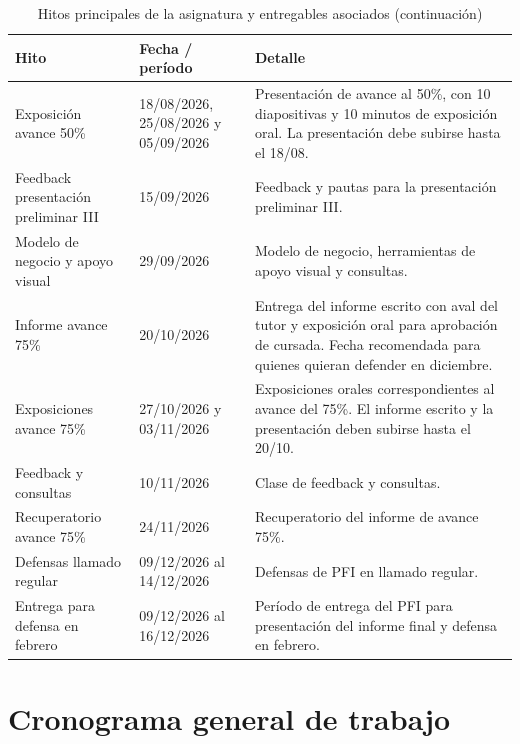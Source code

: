 \begin{table}[H]
\centering
\caption{Hitos principales de la asignatura y entregables asociados (continuación)}
\label{tab:hitos_pfi_continuacion}
\small
\begin{tabularx}{\textwidth}{p{} p{} X}
\hline
\textbf{Hito} & \textbf{Fecha / período} & \textbf{Detalle} \\
\hline
Exposición avance 50\% & 18/08/2026, 25/08/2026 y 05/09/2026 & Presentación de avance al 50\%, con 10 diapositivas y 10 minutos de exposición oral. La presentación debe subirse hasta el 18/08. \\
Feedback presentación preliminar III & 15/09/2026 & Feedback y pautas para la presentación preliminar III. \\
Modelo de negocio y apoyo visual & 29/09/2026 & Modelo de negocio, herramientas de apoyo visual y consultas. \\
Informe avance 75\% & 20/10/2026 & Entrega del informe escrito con aval del tutor y exposición oral para aprobación de cursada. Fecha recomendada para quienes quieran defender en diciembre. \\
Exposiciones avance 75\% & 27/10/2026 y 03/11/2026 & Exposiciones orales correspondientes al avance del 75\%. El informe escrito y la presentación deben subirse hasta el 20/10. \\
Feedback y consultas & 10/11/2026 & Clase de feedback y consultas. \\
Recuperatorio avance 75\% & 24/11/2026 & Recuperatorio del informe de avance 75\%. \\
Defensas llamado regular & 09/12/2026 al 14/12/2026 & Defensas de PFI en llamado regular. \\
Entrega para defensa en febrero & 09/12/2026 al 16/12/2026 & Período de entrega del PFI para presentación del informe final y defensa en febrero. \\
\hline
\end{tabularx}
\end{table}

\section{Cronograma general de trabajo}

